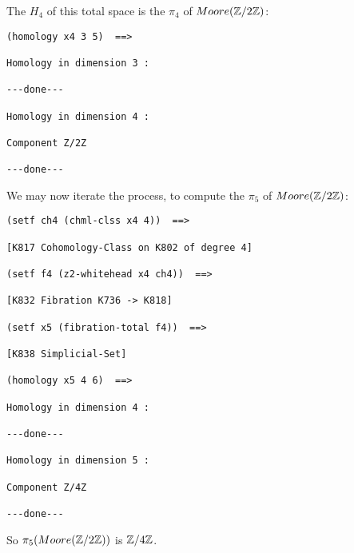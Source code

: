 The $H_4$ of this total space is the $\pi_4$ of $Moore({{\mathbb{Z}}}/2{{\mathbb{Z}}})$:
{\footnotesize\begin{verbatim}
(homology x4 3 5)  ==>

Homology in dimension 3 :

---done---

Homology in dimension 4 :

Component Z/2Z

---done---
\end{verbatim}}
We may now iterate the process, to compute the $\pi_5$ of $Moore({{\mathbb{Z}}}/2{{\mathbb{Z}}})$:
{\footnotesize\begin{verbatim}
(setf ch4 (chml-clss x4 4))  ==>

[K817 Cohomology-Class on K802 of degree 4]

(setf f4 (z2-whitehead x4 ch4))  ==>

[K832 Fibration K736 -> K818]

(setf x5 (fibration-total f4))  ==>

[K838 Simplicial-Set]

(homology x5 4 6)  ==>

Homology in dimension 4 :

---done---

Homology in dimension 5 :

Component Z/4Z

---done---
\end{verbatim}}
So $\pi_5(Moore({{\mathbb{Z}}}/2{{\mathbb{Z}}}))$ is ${{\mathbb{Z}}}/4{{\mathbb{Z}}}$.